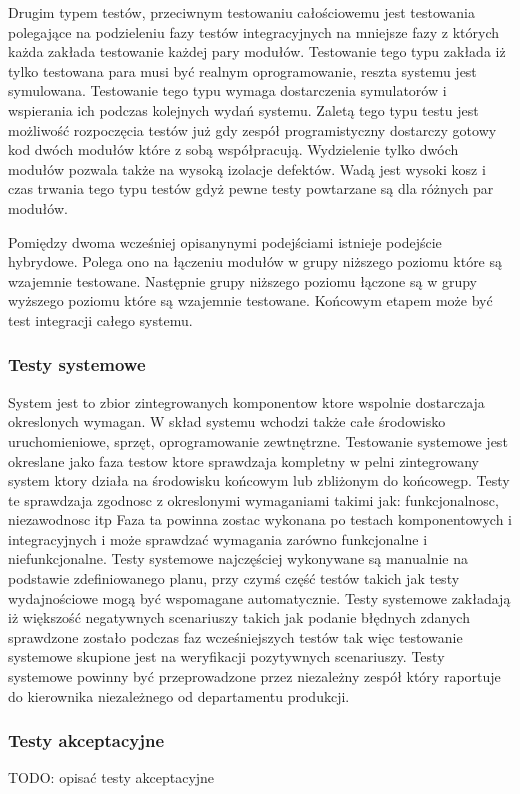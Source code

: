 Drugim typem testów, przeciwnym testowaniu całościowemu jest testowania polegające na podzieleniu fazy testów integracyjnych na mniejsze fazy z których każda zakłada testowanie każdej pary modułów. Testowanie tego typu zakłada iż tylko testowana para musi być realnym oprogramowanie, reszta systemu jest symulowana. Testowanie tego typu wymaga dostarczenia symulatorów i wspierania ich podczas kolejnych wydań systemu. Zaletą tego typu testu jest możliwość rozpoczęcia testów już gdy zespół programistyczny dostarczy gotowy kod dwóch modułów które z sobą współpracują. Wydzielenie tylko dwóch modułów pozwala także na wysoką izolacje defektów. Wadą jest wysoki kosz i czas trwania tego typu testów gdyż pewne testy powtarzane są dla różnych par modułów.

Pomiędzy dwoma wcześniej opisanynymi podejściami istnieje podejście hybrydowe. Polega ono na łączeniu modułów w grupy niższego poziomu które są wzajemnie testowane. Następnie grupy niższego poziomu łączone są w grupy wyższego poziomu które są wzajemnie testowane. Końcowym etapem może być test integracji całego systemu.
\subsubsection{Testy systemowe}
System jest to zbior zintegrowanych komponentow ktore wspolnie dostarczaja okreslonych wymagan. W skład systemu wchodzi także całe środowisko uruchomieniowe, sprzęt, oprogramowanie zewtnętrzne. Testowanie systemowe jest okreslane jako faza testow ktore sprawdzaja kompletny w pelni zintegrowany system ktory działa na środowisku końcowym lub zbliżonym do końcowegp. Testy te sprawdzaja zgodnosc z okreslonymi wymaganiami takimi jak: funkcjonalnosc, niezawodnosc itp
Faza ta powinna zostac wykonana po testach komponentowych i integracyjnych i może sprawdzać wymagania zarówno funkcjonalne i niefunkcjonalne.
Testy systemowe najczęściej wykonywane są manualnie na podstawie zdefiniowanego planu, przy czymś część testów takich jak testy wydajnościowe mogą być wspomagane automatycznie.
Testy systemowe zakładają iż większość negatywnych scenariuszy takich jak podanie błędnych zdanych sprawdzone zostało podczas faz wcześniejszych testów tak więc testowanie systemowe skupione jest na weryfikacji pozytywnych scenariuszy. 
Testy systemowe powinny być przeprowadzone przez niezależny zespół który raportuje do kierownika niezależnego od departamentu produkcji. 

\subsubsection{Testy akceptacyjne}
TODO: opisać testy akceptacyjne


